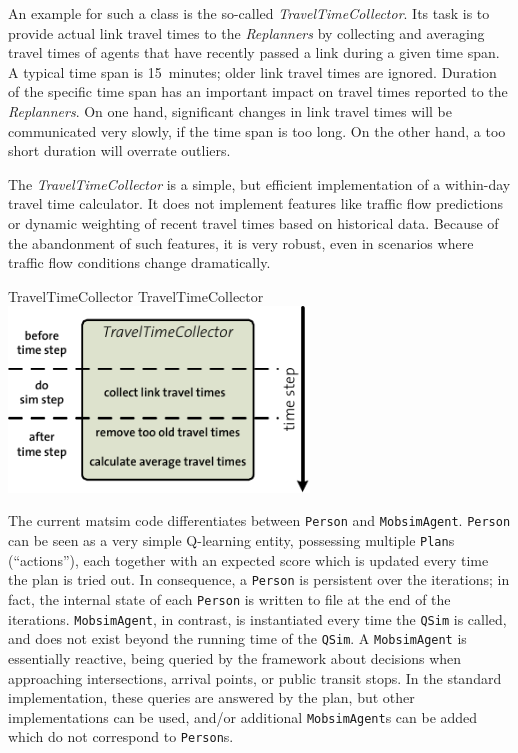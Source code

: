 An example for such a class is the so-called \emph{TravelTimeCollector}. Its task is to provide actual link travel times to the \emph{Replanners} by collecting and averaging travel times of agents that have recently passed a link during a given time span. A typical time span is 15~minutes; older link travel times are ignored. Duration of the specific time span has an important impact on travel times reported to the \emph{Replanners}. On one hand, significant changes in link travel times will be communicated very slowly, if the time span is too long. On the other hand, a too short duration will overrate outliers.

The \emph{TravelTimeCollector} is a simple, but efficient implementation of a within-day travel time calculator. It does not implement features like traffic flow predictions or dynamic weighting of recent travel times based on historical data. 
Because of the abandonment of such features, it is very robust, even in scenarios where traffic flow conditions change dramatically.

\createfigure%
{TravelTimeCollector}%
{TravelTimeCollector}%
{\label{fig:labelTravelTimeCollector}}%
{\includegraphics[width=8.0cm, angle=0]{extending/figures/WithinDayReplanning/TravelTimeCollector}}%
{}


The current \acrshort{matsim} code differentiates between \verb$Person$ and \verb$MobsimAgent$.  
%
\verb$Person$ can be seen as a very simple Q-learning entity, possessing multiple \verb$Plan$s (``actions''), each together with an expected score which is updated every time the plan is tried out.  In consequence, a \verb$Person$ is persistent over the iterations; in fact, the internal state of each \verb$Person$ is written to file at the end of the iterations.
%
\verb$MobsimAgent$, in contrast, is instantiated every time the \verb$QSim$ is called, and does not exist beyond the running time of the \verb$QSim$.  A \verb$MobsimAgent$ is essentially reactive, being queried by the framework about decisions when approaching intersections, arrival points, or public transit stops.  In the standard implementation, these queries are answered by the plan, but other implementations can be used, and/or additional \verb$MobsimAgent$s can be added which do not correspond to \verb$Person$s.

